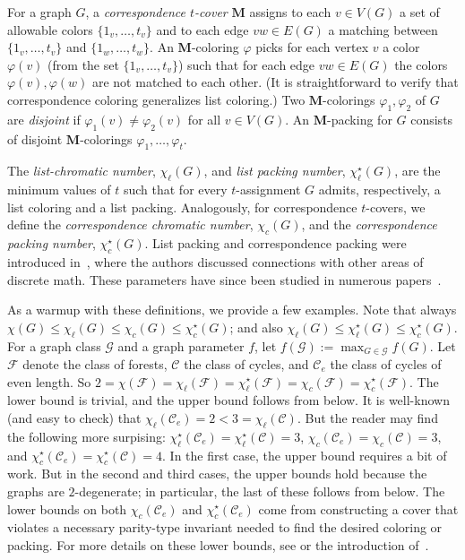 \documentclass[11pt]{article}
\theoremstyle{definition}
\newcommand\vph{\varphi}
\newcommand\chisl{\chi^{\star}_{\ell}}
\newcommand\chil{\chi_{\ell}}
\newcommand\chisc{\chi^{\star}_{c}}
\newcommand\chic{\chi_{c}}
\renewcommand\le{\leqslant}
\newcommand\C{\mathcal{C}}
\newcommand\F{\mathcal{F}}
\newcommand\G{\mathcal{G}}
\newcommand\MM{\textbf{M}}
\begin{document}
	For a graph $G$, a \emph{correspondence $t$-cover} $\MM$ assigns 
	to each $v\in V(G)$ a set of allowable colors $\{1_v,\ldots,t_v\}$ and to each edge $vw\in E(G)$
	a matching between $\{1_v,\ldots,t_v\}$ and $\{1_w,\ldots,t_w\}$. An $\MM$-coloring $\vph$
	picks for each vertex $v$ a color $\vph(v)$ (from the set $\{1_v,\ldots,t_v\}$) such that for
	each edge $vw\in E(G)$ the colors $\vph(v),\vph(w)$ are not matched to each other.
	(It is straightforward to verify that correspondence coloring generalizes list coloring.)
	Two $\MM$-colorings $\vph_1,\vph_2$ of $G$ are \emph{disjoint} if $\vph_1(v)\ne\vph_2(v)$ for all 
	$v\in V(G)$.  An $\MM$-packing for $G$ consists of disjoint $\MM$-colorings $\vph_1,\ldots, \vph_t$.

	The \emph{list-chromatic number}, $\chil(G)$, and \emph{list packing number},
	$\chisl(G)$, are the minimum values of $t$ such that for every $t$-assignment $G$ admits,
	respectively, a list coloring and a list packing.  Analogously, for correspondence $t$-covers, we 
	define the \emph{correspondence chromatic number}, $\chic(G)$, and the \emph{correspondence packing 
	number}, $\chisc(G)$. List packing and correspondence packing were introduced in~\cite{CCvBDK}, where
	the authors discussed connections with other areas of discrete math.  These parameters have since 
	been studied in numerous papers~\cite{BCK25,CCvB,CCvBDK2,CCvBZ,CH23,CDKH24,CSr,KMMP22,KM25,M23}.

	As a warmup with these definitions, we provide a few examples.  Note that always $\chi(G)\le \chil(G)
	\le \chic(G)\le \chisc(G)$; and also $\chil(G)\le \chisl(G)\le \chisc(G)$.  For a graph class $\G$
	and a graph parameter $f$, let $f(\G):=\max_{G\in \G}f(G)$.  Let $\F$ denote the class of forests,
	$\C$ the class of cycles, and $\C_e$ the class of cycles of even length.
	So $2=\chi(\F)=\chil(\F)=\chisl(\F)=\chic(\F)=\chisc(\F)$.  The lower bound is trivial, and the 
	upper bound follows from  below.  It is well-known (and easy to check) that 
	$\chil(\C_e) = 2 < 3 = \chil(\C)$.  But the reader may find the following more surpising:
	$\chisl(\C_e)=\chisl(\C)=3$, $\chic(\C_e)=\chic(\C)=3$, and $\chisc(\C_e)=\chisc(\C)=4$. 
	In the first case, the upper bound requires a bit of work.  But in the second and third cases, 
	the upper bounds hold because the graphs are $2$-degenerate; in 
	particular, the last of these follows from  below.  The lower bounds on both
	$\chic(\C_e)$ and $\chisc(\C_e)$ come from constructing a cover that violates a necessary
	parity-type invariant needed to find the desired coloring or packing.
	For more details on these lower bounds, see \cite{CCvBDK2} or the introduction of~\cite{CSr}.
\end{document}
